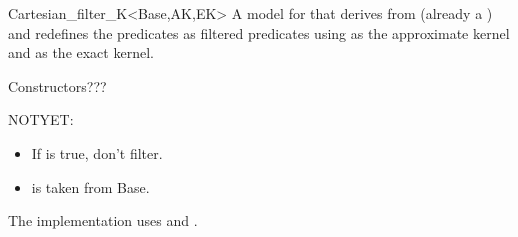\begin{ccRefClass}{Cartesian_filter_K<Base,AK,EK>}
\ccDefinition
A model for  that derives from  (already a
) and redefines the predicates as filtered predicates
using  as the approximate kernel and  as the exact
kernel.

\ccIsModel
{}

Constructors???

NOTYET:
\begin{itemize}
  \item If  is true, don't filter.
  \item {} is taken from Base.
\end{itemize}

\ccImplementation
The implementation uses  and
.

\end{ccRefClass}
